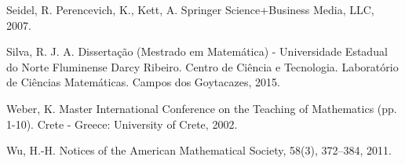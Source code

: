 \begin{thebibliography}{1}
  
      Seidel, R. Perencevich, K., Kett, A.
  \newblock Springer Science+Business Media, LLC, 2007.

  
     Silva, R. J. A.
  \newblock Dissertação (Mestrado em Matemática) - Universidade Estadual do Norte Fluminense Darcy Ribeiro. Centro de Ciência e Tecnologia. Laboratório de Ciências Matemáticas. Campos dos Goytacazes, 2015.
  
  
     Weber, K.
  \newblock Master International Conference on the Teaching of Mathematics (pp. 1-10). Crete - Greece: University of Crete, 2002.


     Wu, H.-H.
  \newblock Notices of the American Mathematical Society, 58(3), 372–384, 2011.






\end{thebibliography}
